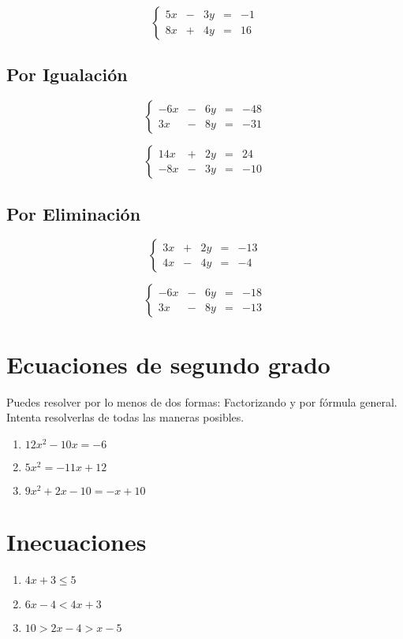 \documentclass[11pt,twocolumn]{article} %
\begin{document}
\begin{equation}
\left\lbrace
\begin{array}{rcrcr}
5x & - & 3y & = & -1\\
8x & + & 4y & = & 16
\end{array}
\right.
\end{equation}
\subsection{Por Igualación}
\begin{equation}
\left\lbrace
\begin{array}{rcrcr}
-6x & - & 6y & = & -48\\
3x & - & 8y & = & -31
\end{array}
\right.
\end{equation}

\begin{equation}
\left\lbrace
\begin{array}{rcrcr}
14x & + & 2y & = & 24\\
-8x & - & 3y & = & -10
\end{array}
\right.
\end{equation}
\subsection{Por Eliminación}
\begin{equation}
\left\lbrace
\begin{array}{rcrcr}
3x & + & 2y & = & -13\\
4x & - & 4y & = & -4
\end{array}
\right.
\end{equation}

\begin{equation}
\left\lbrace
\begin{array}{rcrcr}
-6x & - & 6y & = & -18\\
3x & - & 8y & = & -13
\end{array}
\right.
\end{equation}
\section{Ecuaciones de segundo grado}
Puedes resolver por lo menos de dos formas: Factorizando y por fórmula general. Intenta resolverlas de todas las maneras posibles.
\begin{enumerate}
\item $12x^2-10x=-6$
\item $5x^2=-11x+12$
\item $9x^2+2x-10=-x+10$
\end{enumerate}
\section{Inecuaciones}
\begin{enumerate}
\item $4x+3\leq 5$
\item $6x-4 < 4x+3$
\item $10>2x-4>x-5$
\end{enumerate}
\end{document}
